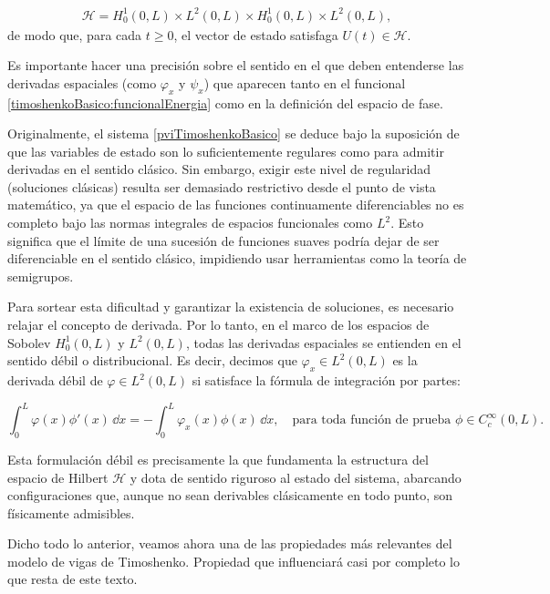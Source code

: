 
\begin{align}
    \mathcal{H} = H_0^1(0,L) \times L^2(0,L) \times H_0^1(0,L) \times L^2(0,L),\label{espacioDeFaseTimoshenko}
\end{align}
de modo que, para cada $t \geq 0$, el vector de estado satisfaga $U(t) \in \mathcal{H}$.

Es importante hacer una precisión sobre el sentido en el que deben entenderse las derivadas espaciales (como $\varphi_x$ y $\psi_x$) que aparecen tanto en el funcional \eqref{timoshenkoBasico:funcionalEnergia} como en la definición del espacio de fase. 

Originalmente, el sistema \eqref{pviTimoshenkoBasico} se deduce bajo la suposición de que las variables de estado son lo suficientemente regulares como para admitir derivadas en el sentido clásico. Sin embargo, exigir este nivel de regularidad (soluciones clásicas) resulta ser demasiado restrictivo desde el punto de vista matemático, ya que el espacio de las funciones continuamente diferenciables no es completo bajo las normas integrales de espacios funcionales como $L^2$. Esto significa que el límite de una sucesión de funciones suaves podría dejar de ser diferenciable en el sentido clásico, impidiendo usar herramientas como la teoría de semigrupos.

Para sortear esta dificultad y garantizar la existencia de soluciones, es necesario relajar el concepto de derivada. Por lo tanto, en el marco de los espacios de Sobolev $H_0^1(0,L)$ y $L^2(0,L)$, todas las derivadas espaciales se entienden en el sentido débil o distribucional. Es decir, decimos que $\varphi_x \in L^2(0,L)$ es la derivada débil de $\varphi \in L^2(0,L)$ si satisface la fórmula de integración por partes:

\[
\int_0^L \varphi(x) \phi'(x) \, \dd x = - \int_0^L \varphi_x(x) \phi(x) \, \dd x, \quad \text{para toda función de prueba } \phi \in C_c^\infty(0,L).
\]

Esta formulación débil es precisamente la que fundamenta la estructura del espacio de Hilbert $\mathcal{H}$ y dota de sentido riguroso al estado del sistema, abarcando configuraciones que, aunque no sean derivables clásicamente en todo punto, son físicamente admisibles.

Dicho todo lo anterior, veamos ahora una de las propiedades más relevantes del modelo de vigas de Timoshenko. Propiedad que influenciará casi por completo lo que resta de este texto.\\

